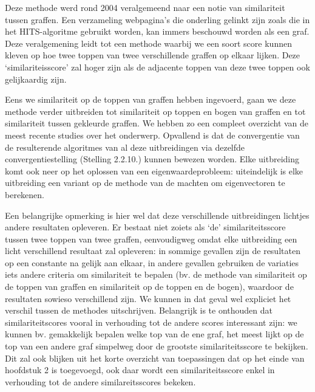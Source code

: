 \documentclass[a4paper,11pt]{report}
\begin{document}
Deze methode werd rond 2004 veralgemeend naar een notie van similariteit tussen 
graffen. Een verzameling webpagina's die onderling gelinkt zijn zoals die in het HITS-algoritme gebruikt worden,
kan immers beschouwd worden als een graf. Deze veralgemening leidt tot een 
methode waarbij we een soort score kunnen kleven op hoe twee toppen van twee verschillende graffen op elkaar lijken. 
Deze `similariteisscore' zal hoger zijn als de adjacente toppen van deze twee toppen 
ook gelijkaardig zijn.

Eens we similariteit op de toppen van graffen hebben ingevoerd, gaan we deze 
methode verder uitbreiden tot similariteit op toppen en bogen van graffen en tot 
similariteit tussen gekleurde graffen. We hebben zo een compleet overzicht van 
de meest recente studies over het onderwerp. Opvallend is dat de convergentie van de resulterende algoritmes van al deze uitbreidingen via 
dezelfde convergentiestelling (Stelling 2.2.10.) kunnen bewezen worden. Elke uitbreiding komt ook 
neer op het oplossen van een eigenwaardeprobleem: uiteindelijk is elke 
uitbreiding een variant op de methode van de machten om eigenvectoren te 
berekenen.

Een belangrijke opmerking is hier wel dat deze verschillende uitbreidingen lichtjes 
andere resultaten opleveren. Er bestaat niet zoiets als `de' similariteitsscore tussen twee 
toppen van twee graffen, eenvoudigweg omdat elke uitbreiding een licht verschillend resultaat zal 
opleveren: in sommige gevallen zijn de resultaten op een constante na gelijk aan 
elkaar, in andere gevallen gebruiken de variaties iets andere criteria om 
similariteit te bepalen (bv. de methode van similariteit op de toppen van graffen en similariteit op de toppen en de bogen), waardoor
de resultaten sowieso verschillend zijn. We kunnen in dat geval wel expliciet het verschil tussen de methodes uitschrijven. Belangrijk is te onthouden 
dat similariteitscores vooral in verhouding tot de andere scores interessant zijn: we kunnen 
bv. gemakkelijk bepalen welke top van de ene graf, het meest lijkt op de top van een andere 
graf simpelweg door de grootste similariteitsscore te bekijken.    Dit zal ook blijken uit het korte overzicht van toepassingen dat op 
het einde van hoofdstuk 2 is toegevoegd, ook daar wordt een
similariteitsscore enkel in verhouding tot de andere similareitsscores bekeken.
\end{document}
